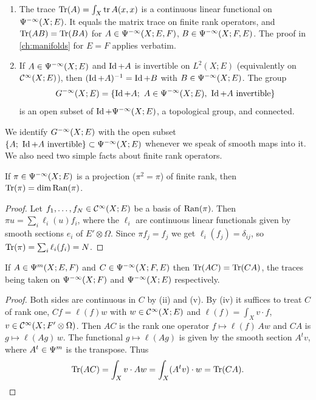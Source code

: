 \begin{enumerate}[label=(\roman*)]
\item The trace $\operatorname{Tr}(A)=\int_X\operatorname{tr} A(x,x)$ is a continuous linear functional on
  $\Psi^{-\infty}(X;E)$. It equals the matrix trace on finite rank operators,
  and $\operatorname{Tr}(AB)=\operatorname{Tr}(BA)$ for $A\in\Psi^{-\infty}(X;E,F)$,
  $B\in\Psi^{-\infty}(X;F,E)$. The proof in \cref{ch:manifolds} for $E=F$
  applies verbatim.
\item If $A\in\Psi^{-\infty}(X;E)$ and $\operatorname{Id}+A$ is invertible on $L^2(X;E)$
  (equivalently on $\mathcal{C}^\infty(X;E)$), then $(\operatorname{Id}+A)^{-1}=\operatorname{Id}+B$ with
  $B\in\Psi^{-\infty}(X;E)$. The group
  \begin{equation*}
    \Ginf(X;E)=\{\Id+A;\ A\in\Psido{-\infty}(X;E),\ \Id+A\text{ invertible}\}
  \end{equation*}
  is an open subset of $\operatorname{Id}+\Psi^{-\infty}(X;E)$, a topological group, and
  connected.
\end{enumerate}
We identify $G^{-\infty}(X;E)$ with the open subset
$\{A;\ \operatorname{Id}+A\text{ invertible}\}\subset\Psi^{-\infty}(X;E)$ whenever we
speak of smooth maps into it. We also need two simple facts about finite rank
operators.

\begin{lemma}\label{index:lem:proj-trace}
  If $\pi\in\Psi^{-\infty}(X;E)$ is a projection ($\pi^2=\pi$) of finite rank,
  then $\operatorname{Tr}(\pi)=\dim\operatorname{Ran}(\pi)$.
\end{lemma}
\begin{proof}
  Let $f_1,\dots,f_N\in\mathcal{C}^\infty(X;E)$ be a basis of $\operatorname{Ran}(\pi)$. Then
  $\pi u=\sum_i\ell_i(u)f_i$, where the $\ell_i$ are continuous linear
  functionals given by smooth sections $e_i$ of $E'\otimes\Omega$. Since
  $\pi f_j=f_j$ we get $\ell_i(f_j)=\delta_{ij}$, so
  $\operatorname{Tr}(\pi)=\sum_i\ell_i(f_i)=N$.
\end{proof}

\begin{lemma}\label{index:lem:trace-commute}
  If $A\in\Psi^{m}(X;E,F)$ and $C\in\Psi^{-\infty}(X;F,E)$ then
  $\operatorname{Tr}(AC)=\operatorname{Tr}(CA)$, the traces being taken on $\Psi^{-\infty}(X;F)$ and
  $\Psi^{-\infty}(X;E)$ respectively.
\end{lemma}
\begin{proof}
  Both sides are continuous in $C$ by (ii) and (v). By (iv) it suffices to
  treat $C$ of rank one, $Cf=\ell(f)w$ with $w\in\mathcal{C}^\infty(X;E)$ and
  $\ell(f)=\int_Xv\cdot f$, $v\in\mathcal{C}^\infty(X;F'\otimes\Omega)$. Then $AC$ is the rank
  one operator $f\mapsto\ell(f)\,Aw$ and $CA$ is $g\mapsto\ell(Ag)\,w$. The
  functional $g\mapsto\ell(Ag)$ is given by the smooth section $A^tv$, where
  $A^t\in\Psi^{m}$ is the transpose. Thus
  \begin{equation*}
    \operatorname{Tr}(AC)=\int_Xv\cdot Aw=\int_X(A^tv)\cdot w=\operatorname{Tr}(CA).\qedhere
  \end{equation*}
\end{proof}

